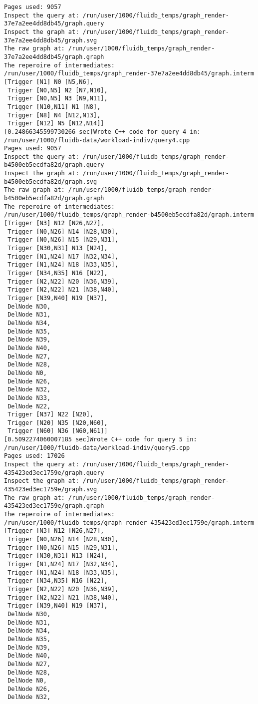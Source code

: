 \begin{code}
\begin{verbatim}
Pages used: 9057
Inspect the query at: /run/user/1000/fluidb_temps/graph_render-37e7a2ee4dd8db45/graph.query
Inspect the graph at: /run/user/1000/fluidb_temps/graph_render-37e7a2ee4dd8db45/graph.svg
The raw graph at: /run/user/1000/fluidb_temps/graph_render-37e7a2ee4dd8db45/graph.graph
The reperoire of intermediates: /run/user/1000/fluidb_temps/graph_render-37e7a2ee4dd8db45/graph.interm
[Trigger [N1] N0 [N5,N6],
 Trigger [N0,N5] N2 [N7,N10],
 Trigger [N0,N5] N3 [N9,N11],
 Trigger [N10,N11] N1 [N8],
 Trigger [N8] N4 [N12,N13],
 Trigger [N12] N5 [N12,N14]]
[0.24866345599730266 sec]Wrote C++ code for query 4 in: /run/user/1000/fluidb-data/workload-indiv/query4.cpp
Pages used: 9057
Inspect the query at: /run/user/1000/fluidb_temps/graph_render-b4500eb5ecdfa82d/graph.query
Inspect the graph at: /run/user/1000/fluidb_temps/graph_render-b4500eb5ecdfa82d/graph.svg
The raw graph at: /run/user/1000/fluidb_temps/graph_render-b4500eb5ecdfa82d/graph.graph
The reperoire of intermediates: /run/user/1000/fluidb_temps/graph_render-b4500eb5ecdfa82d/graph.interm
[Trigger [N3] N12 [N26,N27],
 Trigger [N0,N26] N14 [N28,N30],
 Trigger [N0,N26] N15 [N29,N31],
 Trigger [N30,N31] N13 [N24],
 Trigger [N1,N24] N17 [N32,N34],
 Trigger [N1,N24] N18 [N33,N35],
 Trigger [N34,N35] N16 [N22],
 Trigger [N2,N22] N20 [N36,N39],
 Trigger [N2,N22] N21 [N38,N40],
 Trigger [N39,N40] N19 [N37],
 DelNode N30,
 DelNode N31,
 DelNode N34,
 DelNode N35,
 DelNode N39,
 DelNode N40,
 DelNode N27,
 DelNode N28,
 DelNode N0,
 DelNode N26,
 DelNode N32,
 DelNode N33,
 DelNode N22,
 Trigger [N37] N22 [N20],
 Trigger [N20] N35 [N20,N60],
 Trigger [N60] N36 [N60,N61]]
[0.5092274060007185 sec]Wrote C++ code for query 5 in: /run/user/1000/fluidb-data/workload-indiv/query5.cpp
Pages used: 17026
Inspect the query at: /run/user/1000/fluidb_temps/graph_render-435423ed3ec1759e/graph.query
Inspect the graph at: /run/user/1000/fluidb_temps/graph_render-435423ed3ec1759e/graph.svg
The raw graph at: /run/user/1000/fluidb_temps/graph_render-435423ed3ec1759e/graph.graph
The reperoire of intermediates: /run/user/1000/fluidb_temps/graph_render-435423ed3ec1759e/graph.interm
[Trigger [N3] N12 [N26,N27],
 Trigger [N0,N26] N14 [N28,N30],
 Trigger [N0,N26] N15 [N29,N31],
 Trigger [N30,N31] N13 [N24],
 Trigger [N1,N24] N17 [N32,N34],
 Trigger [N1,N24] N18 [N33,N35],
 Trigger [N34,N35] N16 [N22],
 Trigger [N2,N22] N20 [N36,N39],
 Trigger [N2,N22] N21 [N38,N40],
 Trigger [N39,N40] N19 [N37],
 DelNode N30,
 DelNode N31,
 DelNode N34,
 DelNode N35,
 DelNode N39,
 DelNode N40,
 DelNode N27,
 DelNode N28,
 DelNode N0,
 DelNode N26,
 DelNode N32,

\end{verbatim}
\end{code}
